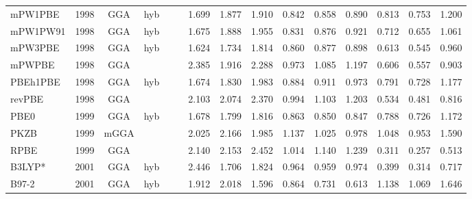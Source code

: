 \begin{landscape}
\begin{longtable}{lcccccrrrrrrrrr}
    mPW1PBE          & 1998 & GGA  & hyb      &             &           & 1.699             & 1.877             & 1.910  & 0.842              & 0.858             & 0.890  & 0.813   & 0.753 & 1.200 \\
    mPW1PW91         & 1998 & GGA  & hyb      &             &           & 1.675             & 1.888             & 1.955  & 0.831              & 0.876             & 0.921  & 0.712   & 0.655 & 1.061 \\
    mPW3PBE          & 1998 & GGA  & hyb      &             &           & 1.624             & 1.734             & 1.814  & 0.860              & 0.877             & 0.898  & 0.613   & 0.545 & 0.960 \\
    mPWPBE           & 1998 & GGA  &          &             &           & 2.385             & 1.916             & 2.288  & 0.973              & 1.085             & 1.197  & 0.606   & 0.557 & 0.903 \\
    PBEh1PBE         & 1998 & GGA  & hyb      &             &           & 1.674             & 1.830             & 1.983  & 0.884              & 0.911             & 0.973  & 0.791   & 0.728 & 1.177 \\
    revPBE           & 1998 & GGA  &          &             &           & 2.103             & 2.074             & 2.370  & 0.994              & 1.103             & 1.203  & 0.534   & 0.481 & 0.816 \\
    PBE0             & 1999 & GGA  & hyb      &             &           & 1.678             & 1.799             & 1.816  & 0.863              & 0.850             & 0.847  & 0.788   & 0.726 & 1.172 \\
    PKZB             & 1999 & mGGA &          &             &           & 2.025             & 2.166             & 1.985  & 1.137              & 1.025             & 0.978  & 1.048   & 0.953 & 1.590 \\
    RPBE             & 1999 & GGA  &          &             &           & 2.140             & 2.153             & 2.452  & 1.014              & 1.140             & 1.239  & 0.311   & 0.257 & 0.513 \\
    B3LYP*           & 2001 & GGA  & hyb      &             &           & 2.446             & 1.706             & 1.824  & 0.964              & 0.959             & 0.974  & 0.399   & 0.314 & 0.717 \\
    B97-2            & 2001 & GGA  & hyb      &             &           & 1.912             & 2.018             & 1.596  & 0.864              & 0.731             & 0.613  & 1.138   & 1.069 & 1.646 \\

\end{longtable}
\end{landscape}

